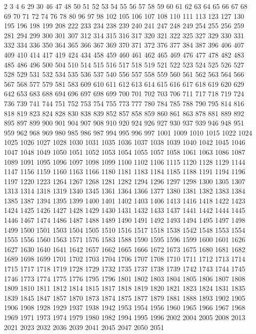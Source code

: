 2
3
4
6
29
30
46
47
48
50
51
52
53
54
55
56
57
58
59
60
61
62
63
64
65
66
67
68
69
70
71
72
74
76
78
80
96
97
98
102
105
106
107
108
110
111
113
123
127
130
195
196
198
199
208
222
233
234
238
239
240
241
247
248
249
254
255
256
259
281
294
299
300
301
307
312
314
315
316
317
320
321
322
325
327
329
330
331
332
334
336
350
364
365
366
367
369
370
371
372
376
377
384
387
396
406
407
409
410
414
417
419
424
434
458
459
460
461
462
465
469
476
477
478
482
483
485
486
496
500
504
510
514
515
516
517
518
519
521
522
523
524
525
526
527
528
529
531
532
534
535
536
537
540
556
557
558
559
560
561
562
563
564
566
567
568
577
579
581
583
609
610
611
612
613
614
615
616
617
618
619
620
629
642
653
683
688
694
696
697
698
699
700
701
702
703
706
711
717
718
719
724
736
739
741
744
751
752
753
754
755
773
777
780
784
785
788
790
795
814
816
818
819
823
824
828
830
838
839
852
857
858
859
860
861
863
878
881
889
892
895
897
899
900
901
904
907
908
910
920
924
926
927
930
937
939
946
948
951
959
962
968
969
980
985
986
987
994
995
996
997
1001
1009
1010
1015
1022
1024
1025
1026
1027
1028
1030
1031
1035
1036
1037
1038
1039
1040
1042
1045
1046
1047
1048
1049
1050
1051
1052
1053
1054
1055
1057
1058
1061
1063
1086
1087
1089
1091
1095
1096
1097
1098
1099
1100
1102
1106
1115
1120
1128
1129
1144
1147
1156
1159
1160
1163
1166
1180
1181
1183
1184
1185
1188
1191
1194
1196
1197
1220
1223
1264
1267
1268
1281
1282
1294
1296
1297
1298
1300
1305
1307
1313
1314
1318
1319
1340
1345
1361
1364
1366
1377
1380
1381
1382
1383
1384
1385
1387
1394
1395
1399
1400
1401
1402
1403
1406
1413
1416
1418
1422
1423
1424
1425
1426
1427
1428
1429
1430
1431
1432
1433
1437
1441
1442
1444
1445
1446
1467
1474
1486
1487
1488
1489
1490
1491
1492
1493
1494
1495
1497
1498
1499
1500
1501
1503
1504
1505
1510
1516
1517
1518
1538
1542
1548
1553
1554
1555
1556
1560
1563
1571
1576
1583
1588
1590
1595
1596
1599
1600
1601
1626
1627
1630
1640
1641
1642
1657
1662
1665
1666
1672
1673
1675
1680
1681
1682
1689
1698
1699
1701
1702
1703
1704
1706
1707
1708
1710
1711
1712
1713
1714
1715
1717
1718
1719
1728
1729
1732
1735
1737
1738
1739
1742
1743
1744
1745
1746
1773
1774
1775
1776
1795
1796
1801
1802
1803
1804
1805
1806
1807
1808
1809
1810
1811
1812
1814
1815
1817
1818
1819
1820
1821
1823
1824
1831
1835
1839
1845
1847
1857
1870
1873
1874
1875
1877
1879
1881
1888
1893
1902
1905
1906
1908
1928
1929
1937
1938
1942
1953
1954
1956
1960
1965
1966
1967
1968
1969
1971
1973
1974
1979
1980
1982
1994
1995
1996
2002
2004
2005
2008
2013
2021
2023
2032
2036
2039
2041
2045
2047
2050
2051


